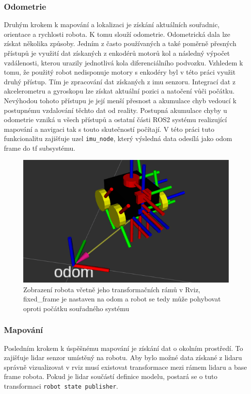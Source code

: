 \subsubsection*{Odometrie}
Druhým krokem k mapování a lokalizaci je získání aktuálních souřadnic, orientace a rychlosti robota. K tomu slouží odometrie. Odometrická dala lze získat několika způsoby. Jedním z často používaných a také poměrně přesných přístupů je využití dat získaných z enkodérů motorů kol a následný výpočet vzdálenosti, kterou urazily jednotlivá kola diferenciálního podvozku. Vzhledem k tomu, že použitý robot nedisponuje motory s enkodéry byl v této práci využit druhý přístup. Tím je zpracování dat získaných z imu senzoru. Integrací dat z akcelerometru a gyroskopu lze získat aktuální pozici a natočení vůči počátku. Nevýhodou tohoto přístupu je její menší přesnost a akumulace chyb vedoucí k postupnému vzdalování těchto dat od reality. Postupná akumulace chyby u odometrie vzniká u všech přístupů a ostatní části ROS2 systému realizující mapování a navigaci tak s touto skutečností počítají. V této práci tuto funkcionalitu zajišťuje uzel \verb|imu_node|, který výsledná data odesílá jako odom frame do tf subsystému. 

\begin{figure}[h!]
	\centering
	\includegraphics[scale=0.6]{obrazky-figures/odom.png}
	\caption{Zobrazení robota včetně jeho transformačních rámů v Rviz, fixed\_frame je nastaven na odom a robot se tedy může pohybovat oproti počátku souřadného systému}
	\label{}
\end{figure}

\subsubsection*{Mapování}
Posledním krokem k úspěšnému mapování je získání dat o okolním prostředí. To zajišťuje lidar senzor umístěný na robotu. Aby bylo možné data získané z lidaru správně vizualizovat v rviz musí existovat transformace mezi rámem lidaru a base frame robota. Pokud je lidar součástí definice modelu, postará se o tuto transformaci \verb|robot state publisher|.

